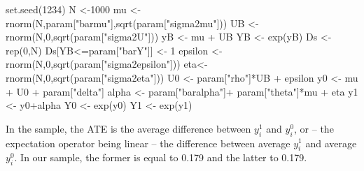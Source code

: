 \documentclass[
]{book}
\newenvironment{Shaded}{\begin{snugshade}}{\end{snugshade}}
\newcommand{\DecValTok}[1]{\textcolor[rgb]{0.00,0.00,0.81}{#1}}
\newcommand{\FunctionTok}[1]{\textcolor[rgb]{0.00,0.00,0.00}{#1}}
\newcommand{\NormalTok}[1]{#1}
\newcommand{\OtherTok}[1]{\textcolor[rgb]{0.56,0.35,0.01}{#1}}
\newcommand{\SpecialCharTok}[1]{\textcolor[rgb]{0.00,0.00,0.00}{#1}}
\newcommand{\StringTok}[1]{\textcolor[rgb]{0.31,0.60,0.02}{#1}}
\theoremstyle{definition}
\theoremstyle{definition}
\theoremstyle{definition}
\theoremstyle{definition}
\theoremstyle{remark}
\begin{document}
\begin{Shaded}
\begin{Highlighting}[]
\FunctionTok{set.seed}\NormalTok{(}\DecValTok{1234}\NormalTok{)}
\NormalTok{N }\OtherTok{\textless{}{-}}\DecValTok{1000}
\NormalTok{mu }\OtherTok{\textless{}{-}} \FunctionTok{rnorm}\NormalTok{(N,param[}\StringTok{"barmu"}\NormalTok{],}\FunctionTok{sqrt}\NormalTok{(param[}\StringTok{"sigma2mu"}\NormalTok{]))}
\NormalTok{UB }\OtherTok{\textless{}{-}} \FunctionTok{rnorm}\NormalTok{(N,}\DecValTok{0}\NormalTok{,}\FunctionTok{sqrt}\NormalTok{(param[}\StringTok{"sigma2U"}\NormalTok{]))}
\NormalTok{yB }\OtherTok{\textless{}{-}}\NormalTok{ mu }\SpecialCharTok{+}\NormalTok{ UB }
\NormalTok{YB }\OtherTok{\textless{}{-}} \FunctionTok{exp}\NormalTok{(yB)}
\NormalTok{Ds }\OtherTok{\textless{}{-}} \FunctionTok{rep}\NormalTok{(}\DecValTok{0}\NormalTok{,N)}
\NormalTok{Ds[YB}\SpecialCharTok{\textless{}=}\NormalTok{param[}\StringTok{"barY"}\NormalTok{]] }\OtherTok{\textless{}{-}} \DecValTok{1} 
\NormalTok{epsilon }\OtherTok{\textless{}{-}} \FunctionTok{rnorm}\NormalTok{(N,}\DecValTok{0}\NormalTok{,}\FunctionTok{sqrt}\NormalTok{(param[}\StringTok{"sigma2epsilon"}\NormalTok{]))}
\NormalTok{eta}\OtherTok{\textless{}{-}} \FunctionTok{rnorm}\NormalTok{(N,}\DecValTok{0}\NormalTok{,}\FunctionTok{sqrt}\NormalTok{(param[}\StringTok{"sigma2eta"}\NormalTok{]))}
\NormalTok{U0 }\OtherTok{\textless{}{-}}\NormalTok{ param[}\StringTok{"rho"}\NormalTok{]}\SpecialCharTok{*}\NormalTok{UB }\SpecialCharTok{+}\NormalTok{ epsilon}
\NormalTok{y0 }\OtherTok{\textless{}{-}}\NormalTok{ mu }\SpecialCharTok{+}\NormalTok{  U0 }\SpecialCharTok{+}\NormalTok{ param[}\StringTok{"delta"}\NormalTok{]}
\NormalTok{alpha }\OtherTok{\textless{}{-}}\NormalTok{ param[}\StringTok{"baralpha"}\NormalTok{]}\SpecialCharTok{+}\NormalTok{  param[}\StringTok{"theta"}\NormalTok{]}\SpecialCharTok{*}\NormalTok{mu }\SpecialCharTok{+}\NormalTok{ eta}
\NormalTok{y1 }\OtherTok{\textless{}{-}}\NormalTok{ y0}\SpecialCharTok{+}\NormalTok{alpha}
\NormalTok{Y0 }\OtherTok{\textless{}{-}} \FunctionTok{exp}\NormalTok{(y0)}
\NormalTok{Y1 }\OtherTok{\textless{}{-}} \FunctionTok{exp}\NormalTok{(y1)}
\end{Highlighting}
\end{Shaded}

In the sample, the ATE is the average difference between \(y_i^1\) and \(y_i^0\), or -- the expectation operator being linear -- the difference between average \(y_i^1\) and average \(y_i^0\).
In our sample, the former is equal to 0.179 and the latter to 0.179.
\end{document}
